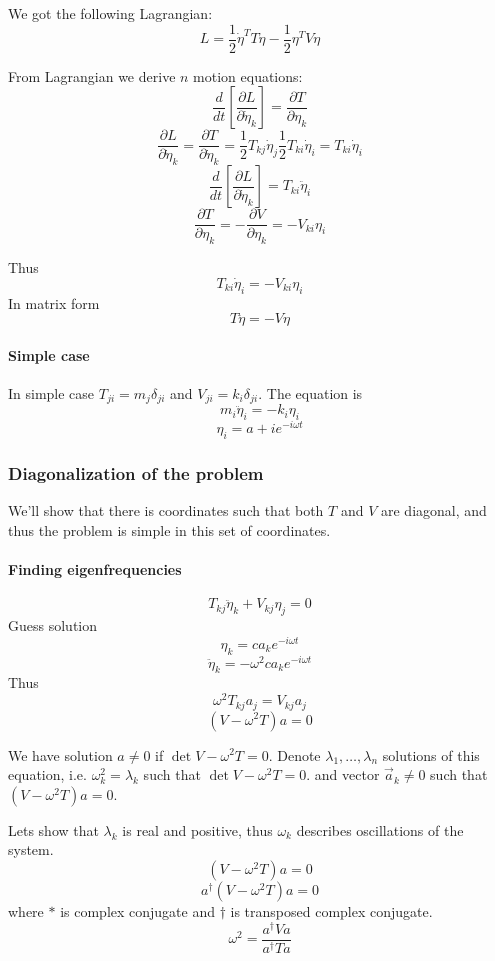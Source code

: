 We got the following Lagrangian:
$$L = \frac{1}{2} \dot{\eta}^T T \dot{\eta} - \frac{1}{2} \eta^T V \eta$$

From Lagrangian we derive $n$ motion equations:
$$\frac{d}{dt}\left[ \frac{\partial L}{\partial \dot{\eta}_k} \right] = \frac{\partial T}{\partial \eta_k}$$ 
$$\frac{\partial L}{\partial \dot{\eta}_k} = \frac{\partial T}{\partial \dot{\eta}_k} = \frac{1}{2}  T_{kj} \dot{\eta}_j \frac{1}{2}  T_{ki} \dot{\eta}_i =  T_{ki} \dot{\eta}_i   $$
$$\frac{d}{dt}\left[ \frac{\partial L}{\partial \dot{\eta}_k} \right]  = T_{ki} \ddot{\eta}_i$$
$$\frac{\partial T}{\partial \eta_k} = -\frac{\partial V}{\partial \eta_k} = -V_{ki} \eta_i$$

Thus
$$ T_{ki} \dot{\eta}_i = -V_{ki} \eta_i$$  
In matrix form
$$T \ddot{\eta} = -V \eta$$

\paragraph{Simple case}
In simple case $T_{ji} = m_j \delta_{ji}$ and $V_{ji} = k_i \delta_{ji}$. The equation is 
$$m_i\ddot{\eta}_i = -k_i \eta_i$$
$$\eta_i = a+i e^{-i\omega t}$$

\subsubsection{Diagonalization of the problem}
We'll show that there is coordinates such that both $T$ and $V$ are diagonal, and thus the problem is simple in this set of coordinates.
\paragraph{Finding eigenfrequencies}
$$T_{kj} \ddot{\eta}_k + V_{kj} \eta_j = 0$$
Guess solution
$$\eta_k = ca_k e^{-i\omega t}$$
$$\ddot{\eta}_k = -\omega^2 ca_k e^{-i\omega t}$$
Thus
$$\omega^2 T_{kj} a_j = V_{kj} a_j$$
$$(V-\omega^2T)a = 0$$

We have solution $a \neq 0$ if $ \det V-\omega^2 T = 0$.
Denote $\lambda_1,\dots,\lambda_n$ solutions of this equation, i.e. $\omega_k^2 = \lambda_k$ such that $ \det V-\omega^2 T = 0$. and vector $\vec{a}_k \neq 0$ such that 
$(V-\omega^2T)a = 0$.


Lets show that $\lambda_k$ is real and positive, thus $\omega_k$ describes oscillations of the system. 
$$(V-\omega^2T)a = 0$$
$$a^\dagger(V-\omega^2T)a = 0$$
where $*$ is complex conjugate and $\dagger$ is transposed complex conjugate. 
$$\omega^2 = \frac{a^\dagger V a}{a^\dagger T a}$$

